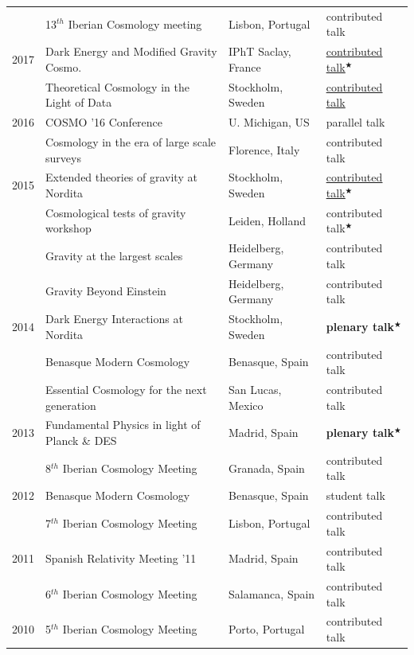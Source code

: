 \documentclass[11pt,a4paper]{article}
\begin{document}
\begin{longtable}{l p{} p{3.5cm} p{3cm}}
      & {13$^{th}$ Iberian Cosmology meeting} & Lisbon, Portugal & {contributed talk}  \\
%  
2017   & {Dark Energy and Modified Gravity Cosmo.} & IPhT Saclay, France & \href{https://youtu.be/f47WCOd_Iqo}{\underline{contributed talk}}$^\bigstar$  \\
& {Theoretical Cosmology in the Light of Data} & Stockholm, Sweden & \href{https://youtu.be/zhuiV8sjFXs}{\underline{contributed talk}}  \\
2016 & {COSMO '16 Conference} & U. Michigan, US & parallel talk \\
& {Cosmology in the era of large scale surveys} & Florence, Italy & contributed talk \\
2015 & {Extended theories of gravity at Nordita} & Stockholm, Sweden & \href{https://www.youtube.com/watch?v=HmfRQPrbp3Y}{\underline{contributed talk}}$^\bigstar$ \\
  & {Cosmological tests of gravity workshop} & Leiden, Holland & contributed talk$^\bigstar$ \\
  & {Gravity at the largest scales} & Heidelberg, Germany & contributed talk \\
   & {Gravity Beyond Einstein} & Heidelberg, Germany & contributed talk \\
2014 & {Dark Energy Interactions at Nordita} & Stockholm, Sweden &\textbf{plenary talk$^\bigstar$} \\ 
 & {Benasque Modern Cosmology} & Benasque, Spain & contributed talk \\
 & {Essential Cosmology for the next generation} & San Lucas, Mexico & contributed talk
 \\[2pt] 
2013 & {Fundamental Physics in light of Planck \& DES} & Madrid, Spain & \textbf{plenary talk$^\bigstar$} \\
 & {8$^{th}$ Iberian Cosmology Meeting} & Granada, Spain & contributed talk \\
2012 & {Benasque Modern Cosmology} & Benasque, Spain & student talk \\
 & {7$^{th}$ Iberian Cosmology Meeting} & Lisbon, Portugal & contributed talk \\
2011 & {Spanish Relativity Meeting '11} & Madrid, Spain & contributed talk \\ 
 & {6$^{th}$ Iberian Cosmology Meeting} & Salamanca, Spain & contributed talk \\
2010 &  {5$^{th}$ Iberian Cosmology Meeting} & Porto, Portugal & contributed talk \\
\end{longtable}
\end{document}
